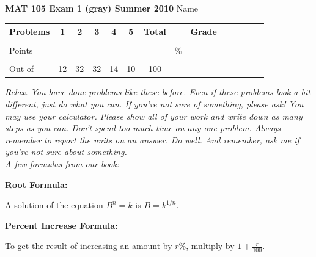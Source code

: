 \documentclass[12pt]{article}
\begin{document}
\textbf{MAT 105 Exam 1 (gray) Summer 2010} \hspace{.4in} {\large Name} \hrulefill

\begin{center}

\begin{tabular}
{|l|c|c|c|c|c|c|c|c|c|c|c|c|c|} \hline

 Problems & \hspace{5 pt} 1 \hspace{5 pt}  & \hspace{5 pt} 2 \hspace{5 pt} & \hspace{5 pt} 3 \hspace{5 pt} & \hspace{5 pt} 4 \hspace{5 pt} & \hspace{5 pt} 5 \hspace{5 pt} & \hspace{5 pt} Total  \hspace{5 pt} & &  \hspace{5 pt} Grade \hspace{5 pt}  \\ \hline
&&&&&&&&\\  
Points &&&&&&&    \hspace{.8in}\% &  \\ 
&&&&&&&& \\  \hline
Out of & 12 & 32 & 32 & 14 & 10 &100 & & \\ \hline

\end {tabular}

\end{center}

\vspace{.2in}

 \emph{Relax.  You have done problems like these before.  Even if these problems look a bit different, just do what you can.  If you're not sure of something, please ask! You may use your calculator.  Please show all of your work and write down as many steps as you can.  Don't spend too much time on any one problem.  Always remember to report the units on an answer. Do well.  And remember, ask me if you're not sure about something.}\\

\vspace{.5in} 
\noindent \emph{A few formulas from our book:}

\begin{center}

\textbf{Root Formula:} 

A solution of the equation $B^n=k$ is $B=k^{1/n}$.

\vspace{.2in} 

\textbf{Percent Increase Formula:} 

To get the result of increasing an amount by $r$\%, multiply by $1 + \frac{r}{100}$.

\end{center}
\end{document}
